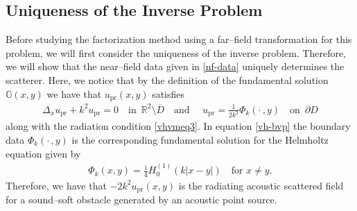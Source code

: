 \documentclass{article}
\newcommand{\exD}{\mathbb{R}^2 \setminus \overline{D}}
\numberwithin{equation}{section}
\begin{document}
\subsection{Uniqueness of the Inverse Problem}\label{unique}
Before studying the factorization method using a far--field transformation for this problem, we will first consider the uniqueness of the inverse problem. Therefore, we will show that the near--field data given in \eqref{nf-data} uniquely determines the scatterer. Here, we notice that by the definition of the fundamental solution $\mathbb{G}(x,y)$ we have that $u_\textrm{pr}(x,y)$ satisfies 
\begin{align} \label{vh-bvp} 
\Delta_x u_\textrm{pr} + k^2 u_\textrm{pr} = 0 \quad \text{in } \,  \exD \quad \text{and } \quad u_\textrm{pr} = \frac{1}{2k^2} \Phi_k ( \cdot \, , y)  \quad \text{on } \,  \partial D
\end{align}
along with the radiation condition \eqref{vhvmeq3}. In equation \eqref{vh-bvp} the boundary data $\Phi_k ( \cdot \, , y)$ is the corresponding fundamental solution for the Helmholtz equation given by 
\begin{align} \label{Phi} 
\Phi_k ( x , y) = \frac{\text{i}}{4} H^{(1)}_0(k|x-y|)  \quad \text{for $x\neq y$.}
\end{align}
Therefore, we have that $-2k^2 u_\textrm{pr} ( x , y)$ is the radiating acoustic scattered field for a sound--soft obstacle generated by an acoustic point source. 
\end{document}
